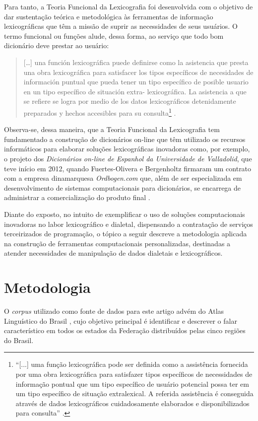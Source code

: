 \documentclass[portuguese]{textolivre}
\begin{document}
Para tanto, a Teoria Funcional da Lexicografia \cite[p. 43]{tarp2008lexicography} foi desenvolvida com o objetivo de dar sustentação teórica e metodológica às ferramentas de informação lexicográficas que têm a missão de suprir as necessidades de seus usuários. O termo funcional ou funções alude, dessa forma, ao serviço que todo bom dicionário deve prestar ao usuário:
\begin{quote}
    [\ldots] una función lexicográfica puede definirse como la asistencia que presta una obra lexicográfica para satisfacer los tipos específicos de necesidades de información puntual que pueda tener un tipo específico de posible usuario en un tipo específico de situación extra- lexicográfica. La asistencia a que se refiere se logra por medio de los datos lexicográficos detenidamente preparados y hechos accesibles para su consulta\footnote{“[...] uma função lexicográfica pode ser definida como a assistência fornecida por uma obra lexicográfica para satisfazer tipos específicos de necessidades de informação pontual que um tipo específico de usuário potencial possa ter em um tipo específico de situação extralexical. A referida assistência é conseguida através de dados lexicográficos cuidadosamente elaborados e disponibilizados para consulta” \cite[p. 36]{tarp2015teoria}.} \cite[p. 26, tradução nossa]{tarp2015teoria}.
\end{quote}

Observa-se, dessa maneira, que a Teoria Funcional da Lexicografia tem fundamentado a construção de dicionários on-line que têm utilizado os recursos informáticos para elaborar soluções lexicográficas inovadoras como, por exemplo, o projeto dos \emph{Dicionários on-line de Espanhol da Universidade de Valladolid}, que teve início em 2012, quando Fuertes-Olivera e Bergenholtz firmaram um contrato com a empresa dinamarquesa \emph{Ordbogen.com} que, além de ser especializada em desenvolvimento de sistemas computacionais para dicionários, se encarrega de administrar a comercialização do produto final \cite[p. 73]{fuertes2015}.

Diante do exposto, no intuito de exemplificar o uso de soluções computacionais inovadoras no labor lexicográfico e dialetal, dispensando a contratação de serviços terceirizados de programação, o tópico a seguir descreve a metodologia aplicada na construção de ferramentas computacionais personalizadas, destinadas a atender necessidades de manipulação de dados dialetais e lexicográficos.


\section{Metodologia}
O \emph{corpus} utilizado como fonte de dados para este artigo advém do Atlas Linguístico do Brasil \cite{comite2001}, cujo objetivo principal é identificar e descrever o falar característico em todos os estados da Federação distribuídos pelas cinco regiões do Brasil. 
\end{document}
